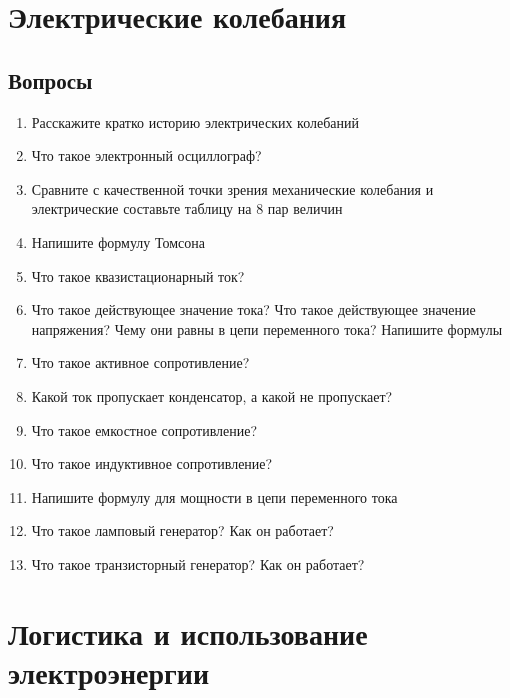 \documentclass[12pt,a4paper]{report}
\begin{document}
\chapter{Электрические колебания}
\section{Вопросы}
\begin{enumerate}
\item Расскажите кратко историю электрических колебаний
\item Что такое электронный осциллограф?
\item Сравните с качественной точки зрения механические колебания и электрические составьте таблицу на 8 пар величин
\item Напишите формулу Томсона
\item Что такое квазистационарный ток? 
\item Что такое действующее значение тока? Что такое действующее значение напряжения? Чему они равны в цепи переменного тока? Напишите формулы
\item Что такое активное сопротивление? 
\item Какой ток пропускает конденсатор, а какой не пропускает?
\item Что такое емкостное сопротивление? 
\item Что такое индуктивное сопротивление? 
\item Напишите формулу для мощности в цепи переменного тока
\item Что такое ламповый генератор? Как он работает?
\item Что такое транзисторный генератор? Как он работает?
\end{enumerate}

\chapter{Логистика и использование электроэнергии}
\end{document}
